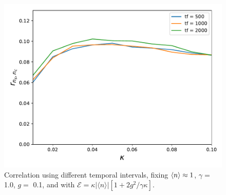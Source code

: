 \documentclass[%
 reprint,
 amsmath,amssymb,
 aps, 
]{revtex4-2}
\begin{document}
\begin{center}
\begin{figure}[h!]
\begin{center}
\includegraphics[scale = 0.5]{million2.pdf}
\caption{\small{Correlation using different temporal intervals, fixing $\expval{n} \approx 1$, $\gamma =$ 1.0, $g =$ 0.1, and with  $\mathcal{E} =  \kappa |\langle n \rangle|[1 + 2g^2/\gamma \kappa]$.}}  \label{errorzz}
\end{center}
\end{figure}
\end{center}

\end{document}

